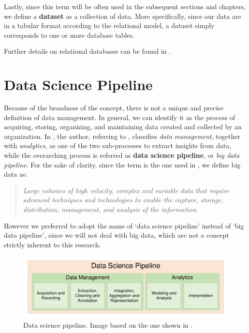 Lastly, since this term will be often used in the subsequent sections and chapters, we define a \textbf{dataset} as a collection of data. More specifically, since our data are in a tabular format according to the relational model, a dataset simply corresponds to one or more database tables.

Further details on relational databases can be found in \cite{abiteboul1995foundations}.


\section{Data Science Pipeline}
\label{section:data_science_pipeline}
Because of the broadness of the concept, there is not a unique and precise definition of data management. In general, we can identify it as the process of acquiring, storing, organizing, and maintaining data created and collected by an organization. In \cite{gandomi2015beyond}, the author, referring to \cite{labrinidis2012challenges}, classifies \textit{data management}, together with \textit{analytics}, as one of the two sub-processes to extract insights from data, while the overarching process is referred as \textbf{data science pipeline}, or \textit{big data pipeline}. For the sake of clarity, since the term is the one used in \cite{gandomi2015beyond}, we define big data as:
\begin{quote}\emph{Large volumes of high velocity, complex and variable data that require advanced techniques and technologies to enable the capture, storage, distribution, management, and analysis of the information.} \cite[p.~10]{mills2012demystifying}\end{quote}
However we preferred to adopt the name of `data science pipeline' instead of `big data pipeline', since we will not deal with big data, which are not a concept strictly inherent to this research.

\begin{figure}[t!]
\includegraphics[scale=.5]{figures/data_science_pipeline.pdf}
\centering
\caption{Data science pipeline. Image based on the one shown in \cite{gandomi2015beyond}.}
\label{fig:data_science_pipeline}
\end{figure}

